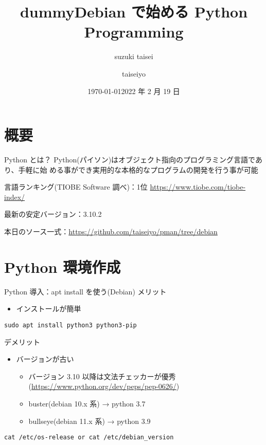 \documentclass[compress,dvipdfmx,11pt]{beamer}
\author{suzuki taisei}
\date{\today}
\title{dummy}
\title[2022 年度 2 月 Debian 勉強会]{\bf Debian で始める Python Programming}
\author[]{taiseiyo}
\institute{Mail Address: taiseiyo11@gmail.com}
\date{2022 年 2 月 19 日}
\begin{document}
\maketitle
\newcommand{\pivec}{\mathbf \pi}
\newcommand{\xvec}{\mathbf x}
\newcommand{\yvec}{\mathbf y}
\newcommand{\zvec}{\mathbf z}
\newcommand{\Emat}{\mathbf E}
\newcommand{\Imat}{\mathbf I}

\section{概要}
\label{sec:orgde7721c}
\begin{frame}[label={sec:org07b4e57}]{Python とは？}
Python(パイソン)はオブジェクト指向のプログラミング言語であり、手軽に始
める事ができ実用的な本格的なプログラムの開発を行う事が可能


言語ランキング(TIOBE Software 調べ)：1位
\url{https://www.tiobe.com/tiobe-index/}


最新の安定バージョン：3.10.2


本日のソース一式：\url{https://github.com/taiseiyo/pman/tree/debian}
\end{frame}

\section{Python 環境作成}
\label{sec:org556f970}
\begin{frame}[label={sec:orgbadc889},fragile]{Python 導入：apt install を使う(Debian)}
 メリット
\begin{itemize}
\item インストールが簡単
\end{itemize}
\begin{verbatim}
sudo apt install python3 python3-pip
\end{verbatim}

デメリット
\begin{itemize}
\item バージョンが古い
\begin{itemize}
\item バージョン 3.10 以降は文法チェッカーが優秀(\url{https://www.python.org/dev/peps/pep-0626/})
\item buster(debian 10.x 系) → python 3.7
\item bullseye(debian 11.x 系) → python 3.9
\end{itemize}
\end{itemize}


\vspace{-2truemm}      
\begin{verbatim}
cat /etc/os-release or cat /etc/debian_version
\end{verbatim}
\end{frame}
\end{document}
